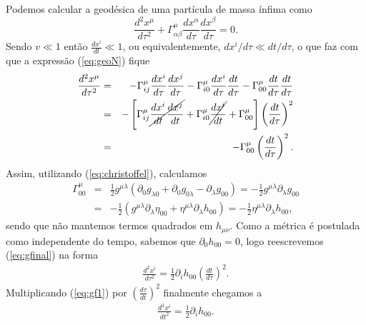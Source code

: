 \documentclass[12pt,a4paper,titlepage,brazil]{article}
\begin{document}
Podemos calcular a geodésica de uma partícula de massa ínfima como
\begin{equation}
 \frac{d^2 x^{\mu}}{d \tau^2} + \Gamma^{\mu}_{\alpha \beta} \frac{d x^{\alpha}}{d \tau} \frac{d x^{\beta}}{d \tau} = 0 . \label{eq:geoN}
\end{equation}
Sendo $v \ll 1$ então $\frac{d x^i}{d t} \ll 1$, ou equivalentemente, $d x^i/d \tau \ll dt / d \tau$, o que faz com que a expressão  (\ref{eq:geoN}) fique
\begin{eqnarray}
 \frac{d^2 x^{\mu}}{d \tau^2} & = & - \Gamma^{\mu}_{i j} \frac{d x^{i}}{d \tau} \frac{d x^{j}}{d \tau} - \Gamma^{\mu}_{i 0} \frac{d x^{i}}{d \tau} \frac{d t}{d \tau} - \Gamma^{\mu}_{0 0} \frac{d t}{d \tau} \frac{d t}{d \tau} \nonumber \\ 
 & = & - \left[ \Gamma^{\mu}_{i j} \cancel{\frac{d x^{i}}{d t} \frac{d x^{j}}{d t}} + \Gamma^{\mu}_{i 0} \cancel{\frac{d x^{i}}{d t}} + \Gamma^{\mu}_{0 0} \right] \left(\frac{d t}{d \tau} \right)^2 \nonumber \\
 & = & - \Gamma^{\mu}_{0 0} \left(\frac{d t}{d \tau} \right)^2 . \label{eq:gfinal}
\end{eqnarray}
Assim, utilizando (\ref{eq:christoffel}), calculamos
\begin{eqnarray}
  \Gamma^{\mu}_{0 0} & = & \frac{1}{2} g^{\mu \lambda} \left(\partial_0 g_{\lambda 0} + \partial_0 g_{0 \lambda} - \partial_{\lambda} g_{0 0} \right) = - \frac{1}{2} g^{\mu \lambda} \partial_{\lambda} g_{0 0} \nonumber\\
  & = & - \frac{1}{2} \left( g^{\mu \lambda} \partial_{\lambda} \eta_{0 0} + \eta^{\mu \lambda} \partial_{\lambda} h_{0 0} \right) =
   - \frac{1}{2} \eta^{\mu \lambda} \partial_{\lambda} h_{0 0} ,
\end{eqnarray}
sendo que não mantemos termos quadrados em $h_{\mu \nu}$. Como a métrica é postulada como independente do tempo, sabemos que $\partial_0 h_{0 0} = 0$, logo reescrevemos (\ref{eq:gfinal}) na forma
\begin{eqnarray}
  \frac{d^2 x^i}{d \tau^2} = \frac{1}{2} \partial_i h_{0 0} \left(\frac{d t}{d \tau}\right)^2 . \label{eq:gf1}
\end{eqnarray}
Multiplicando (\ref{eq:gf1}) por $\left(\frac{d \tau}{d t}\right)^2$ finalmente chegamos a
\begin{eqnarray}
  \frac{d^2 x^i}{d t^2} = \frac{1}{2} \partial_i h_{0 0} . \label{eq:LN}
\end{eqnarray}  
\end{document}
